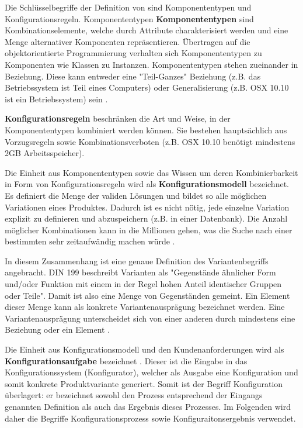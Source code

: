 \documentclass[12pt,a4paper,bibliography=totocnumbered,listof=totoc]{scrartcl}
\begin{document}
Die Schlüsselbegriffe der Definition von \citeauthor{sabin98} sind Komponententypen und Konfigurationsregeln. Komponententypen \textbf{Komponententypen} sind Kombinationselemente, welche durch Attribute charakterisiert werden und eine Menge alternativer Komponenten repräsentieren. Übertragen auf die objektorientierte Programmierung verhalten sich Komponententypen zu Komponenten wie Klassen zu Instanzen. Komponententypen stehen zueinander in Beziehung. Diese kann entweder eine "Teil-Ganzes" Beziehung (z.B. das Betriebssystem ist Teil eines Computers) oder Generalisierung (z.B. OSX 10.10 ist ein Betriebssystem) sein \citep{felferning14}. 

\textbf{Konfigurationsregeln} beschränken die Art und Weise, in der Komponententypen kombiniert werden können. Sie bestehen hauptsächlich aus Vorzugsregeln sowie Kombinationsverboten (z.B. OSX 10.10 benötigt mindestens 2GB Arbeitsspeicher).

Die Einheit aus Komponententypen sowie das Wissen um deren Kombinierbarkeit in Form von Konfigurationsregeln wird als \textbf{Konfigurationsmodell} bezeichnet. Es definiert die Menge der validen Lösungen und bildet so alle möglichen Variationen eines Produktes. Dadurch ist es nicht nötig, jede einzelne Variation explizit zu definieren und abzuspeichern (z.B. in einer Datenbank). Die Anzahl möglicher Kombinationen kann in die Millionen gehen, was die Suche nach einer bestimmten sehr zeitaufwändig machen würde \citep{falkner11}.

In diesem Zusammenhang ist eine genaue Definition des Variantenbegriffs angebracht. DIN 199 beschreibt Varianten als "Gegenstände ähnlicher Form und/oder Funktion mit einem in der Regel hohen Anteil identischer Gruppen oder Teile". Damit ist also eine Menge von Gegenständen gemeint. Ein Element dieser Menge kann als konkrete Variantenausprägung bezeichnet werden. Eine Variantenausprägung unterscheidet sich von einer anderen durch mindestens eine Beziehung oder ein Element \citep{lutz11}.

Die Einheit aus Konfigurationsmodell und den Kundenanforderungen wird als \textbf{Konfigurationsaufgabe} bezeichnet \citep{felferning14}. Dieser ist die Eingabe in das Konfigurationssystem (Konfigurator), welcher als Ausgabe eine Konfiguration und somit konkrete Produktvariante generiert. Somit ist der Begriff Konfiguration überlagert: er bezeichnet sowohl den Prozess entsprechend der Eingangs genannten Definition als auch das Ergebnis dieses Prozesses. Im Folgenden wird daher die Begriffe Konfigurationsprozess sowie Konfiguraitonsergebnis verwendet.
\end{document}
